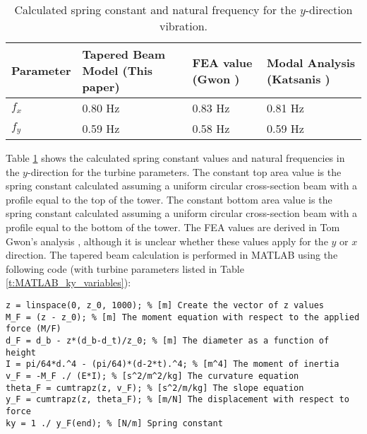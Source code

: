 \begin{table}[]
\caption{Calculated spring constant and natural frequency for the $y$-direction vibration.} \label{t:ky_values}
\begin{center}
\begin{tabular}{|p{1in}|p{1.5in}|p{1in}|p{1.3in}|}
\rowcolor[HTML]{EFEFEF} 
\hline
\textbf{Parameter} & \textbf{Tapered Beam Model (This paper)} & \textbf{FEA value (Gwon \cite{Gwon_paper})} & \textbf{Modal Analysis (Katsanis \cite{george2013transient})} \\ \hline
$f_x$ & 0.80 Hz & 0.83 Hz & 0.81 Hz\\ \hline
$f_y$ & 0.59 Hz & 0.58 Hz & 0.59 Hz\\ \hline
\end{tabular}
\end{center}
\end{table}

Table \ref{t:ky_values} shows the calculated spring constant values and natural frequencies in the $y$-direction for the turbine parameters.  The constant top area value is the spring constant calculated assuming a uniform circular cross-section beam with a profile equal to the top of the tower.  The constant bottom area value is the spring constant calculated assuming a uniform circular cross-section beam with a profile equal to the bottom of the tower.  The FEA values are derived in Tom Gwon's analysis \cite{Gwon_paper}, although it is unclear whether these values apply for the $y$ or $x$ direction.  The tapered beam calculation is performed in MATLAB using the following code (with turbine parameters listed in Table \ref{t:MATLAB_ky_variables}):

\begin{lstlisting}
z = linspace(0, z_0, 1000); % [m] Create the vector of z values
M_F = (z - z_0); % [m] The moment equation with respect to the applied force (M/F)
d_F = d_b - z*(d_b-d_t)/z_0; % [m] The diameter as a function of height
I = pi/64*d.^4 - (pi/64)*(d-2*t).^4; % [m^4] The moment of inertia
v_F = -M_F ./ (E*I); % [s^2/m^2/kg] The curvature equation
theta_F = cumtrapz(z, v_F); % [s^2/m/kg] The slope equation
y_F = cumtrapz(z, theta_F); % [m/N] The displacement with respect to force
ky = 1 ./ y_F(end); % [N/m] Spring constant
\end{lstlisting}
\FloatBarrier


